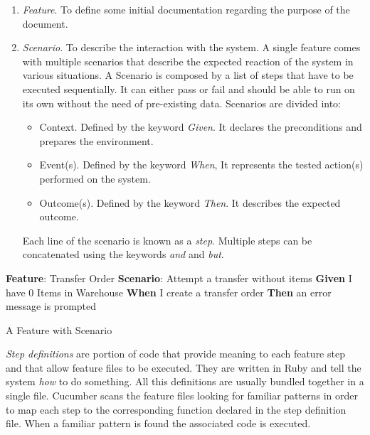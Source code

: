\begin{enumerate}
  \item \textit{Feature}. To define some initial documentation regarding the purpose of the document.
  \item \textit{Scenario}. To describe the interaction with the system. A single feature comes with multiple scenarios that describe the expected reaction of the system in various situations. A Scenario is composed by a list of steps that have to be executed sequentially. It can either pass or fail and should be able to run on its own without the need of pre-existing data. Scenarios are divided into:
  \begin{itemize}
    \item Context. Defined by the keyword \textit{Given}. It declares the preconditions and prepares the environment.
    \item Event(s). Defined by the keyword \textit{When}, It represents the tested action(s) performed on the system.
    \item Outcome(s). Defined by the keyword \textit{Then}. It describes the expected outcome.
  \end{itemize}
  
  Each line of the scenario is known as a \textit{step}. Multiple steps can be concatenated using the keywords \textit{and} and \textit{but}.
\end{enumerate}

\begin{algorithm}[H]
\SetAlgoLined
\textbf{Feature}: Transfer Order\;
    \hspace{5mm} \textbf{Scenario}: Attempt a transfer without items\;
        \hspace{10mm} \textbf{Given} I have 0 Items in Warehouse\;
        \hspace{10mm} \textbf{When} I create a transfer order\;
        \hspace{10mm} \textbf{Then} an error message is prompted\;
\caption{A Feature with Scenario}
\label{alg:featureWithScenario}
\end{algorithm}


\textit{Step definitions} are portion of code that provide meaning to each feature step and that allow feature files to be executed. They are written in Ruby and tell the system \textit{how} to do something. All this definitions are usually bundled together in a single file. Cucumber scans the feature files looking for familiar patterns in order to map each step to the corresponding function declared in the step definition file. When a familiar pattern is found the associated code is executed. 
